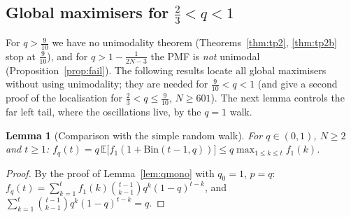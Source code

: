 \documentclass[11pt,a4paper]{article}
\newtheorem{lemma}[theorem]{Lemma}
\theoremstyle{definition}
\theoremstyle{remark}
\newcommand{\E}{\mathbb{E}}
\begin{document}
\subsection{Global maximisers for \texorpdfstring{$\frac23<q<1$}{2/3<q<1}}

For $q>\frac9{10}$ we have no unimodality theorem (Theorems~\ref{thm:tp2}, \ref{thm:tp2b} stop at $\frac9{10}$), and
for $q>1-\frac1{2N-3}$ the PMF is \emph{not} unimodal (Proposition~\ref{prop:fail}). The following results locate all
global maximisers without using unimodality; they are needed for $\frac9{10}<q<1$ (and give a second proof of
the localisation for $\frac23<q\le\frac9{10}$, $N\ge601$). The next lemma controls the far left tail,
where the oscillations live, by the $q=1$ walk.

\begin{lemma}[Comparison with the simple random walk]\label{lem:compare}
For $q\in(0,1)$, $N\ge2$ and $t\ge1$: $f_q(t)=q\,\E\bigl[f_1(1+\mathrm{Bin}(t-1,q))\bigr]\le q\max_{1\le k\le t}f_1(k)$.
\end{lemma}
\begin{proof}
By the proof of Lemma~\ref{lem:qmono} with $q_0=1$, $p=q$: $f_q(t)=\sum_{k=1}^tf_1(k)\binom{t-1}{k-1}q^k(1-q)^{t-k}$, and
$\sum_{k=1}^t\binom{t-1}{k-1}q^k(1-q)^{t-k}=q$.
\end{proof}
\end{document}
